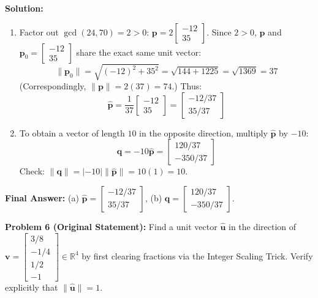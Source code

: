 \documentclass[11pt, letterpaper]{article}
\theoremstyle{definition}
\theoremstyle{remark}
\begin{document}
\textbf{Solution:}
\begin{enumerate}[label=(\alph*)]
    \item Factor out $\gcd(24, 70) = 2 > 0$: $\mathbf{p} = 2\begin{bmatrix} -12 \\ 35 \end{bmatrix}$. Since $2 > 0$, $\mathbf{p}$ and $\mathbf{p}_0 = \begin{bmatrix} -12 \\ 35 \end{bmatrix}$ share the exact same unit vector:
    \[
    \|\mathbf{p}_0\| = \sqrt{(-12)^2 + 35^2} = \sqrt{144 + 1225} = \sqrt{1369} = 37
    \]
    (Correspondingly, $\|\mathbf{p}\| = 2(37) = 74$.) Thus:
    \[
    \hat{\mathbf{p}} = \frac{1}{37}\begin{bmatrix} -12 \\ 35 \end{bmatrix} = \begin{bmatrix} -12/37 \\ 35/37 \end{bmatrix}
    \]
    \item To obtain a vector of length $10$ in the opposite direction, multiply $\hat{\mathbf{p}}$ by $-10$:
    \[
    \mathbf{q} = -10\hat{\mathbf{p}} = \begin{bmatrix} 120/37 \\ -350/37 \end{bmatrix}
    \]
    Check: $\|\mathbf{q}\| = |-10|\|\hat{\mathbf{p}}\| = 10(1) = 10$.
\end{enumerate}
\textbf{Final Answer:} (a) $\hat{\mathbf{p}} = \begin{bmatrix} -12/37 \\ 35/37 \end{bmatrix}$, (b) $\mathbf{q} = \begin{bmatrix} 120/37 \\ -350/37 \end{bmatrix}$.

\medskip
\textbf{Problem 6 (Original Statement):} Find a unit vector $\hat{\mathbf{u}}$ in the direction of $\mathbf{v} = \begin{bmatrix} 3/8 \\ -1/4 \\ 1/2 \\ -1 \end{bmatrix} \in \mathbb{R}^4$ by first clearing fractions via the Integer Scaling Trick. Verify explicitly that $\|\hat{\mathbf{u}}\| = 1$.
\end{document}

